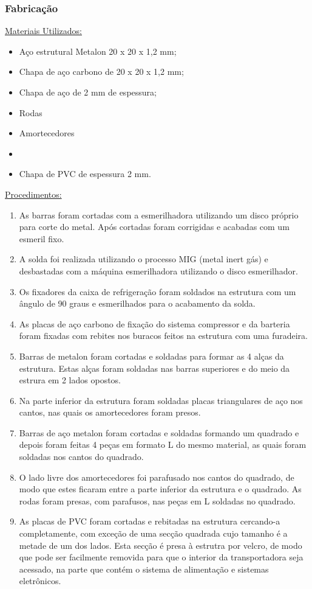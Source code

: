 \subsubsection{Fabricação}

\underline{Materiais Utilizados:}

\begin{itemize}
	\item Aço estrutural Metalon 20 x 20 x 1,2 mm;
	\item Chapa de aço carbono de 20 x 20 x 1,2 mm;
	\item Chapa de aço de 2 mm de espessura;
	\item Rodas
	\item Amortecedores
	\item 
	\item Chapa de PVC de espessura 2 mm.
\end{itemize}

\underline{Procedimentos:}

\begin{enumerate}
	\item As barras foram cortadas com a esmerilhadora utilizando um disco próprio para corte do metal. Após cortadas foram corrigidas e acabadas com um esmeril fixo.
	\item A solda foi realizada utilizando o processo MIG (metal inert gás) e desbastadas com a máquina esmerilhadora utilizando o disco esmerilhador.
	\item Os fixadores da caixa de refrigeração foram soldados na estrutura com um ângulo de 90 graus e esmerilhados para o acabamento da solda.
	\item As placas de aço carbono de fixação do sistema compressor e da barteria foram fixadas com rebites nos buracos feitos na estrutura com uma furadeira.
	\item Barras de metalon foram cortadas e soldadas para formar as 4 alças da estrutura. Estas alças foram soldadas nas barras superiores e do meio da estrura em 2 lados opostos.
	\item Na parte inferior da estrutura foram soldadas placas triangulares de aço nos cantos, nas quais os amortecedores foram presos.
	\item Barras de aço metalon foram cortadas e soldadas formando um quadrado e depois foram feitas 4 peças em formato L do mesmo material, as quais foram soldadas nos cantos do quadrado.
	\item O lado livre dos amortecedores foi parafusado nos cantos do quadrado, de modo que estes ficaram entre a parte inferior da estrutura e o quadrado. As rodas foram presas, com parafusos, nas peças em L soldadas no quadrado.
	\item As placas de PVC foram cortadas e rebitadas na estrutura cercando-a completamente, com exceção de uma secção quadrada cujo tamanho é a metade de um dos lados. Esta secção é presa à estrutra por velcro, de modo que pode ser facilmente removida para que o interior da transportadora seja acessado, na parte que contém o sistema de alimentação e sistemas eletrônicos.
\end{enumerate}

